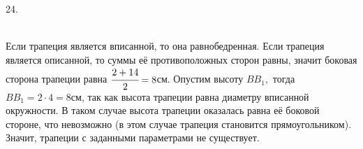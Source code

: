 24. \begin{figure}[ht!]
\end{figure}\\
Если трапеция является вписанной, то она равнобедренная. Если трапеция является описанной, то суммы её противоположных сторон равны, значит боковая сторона трапеции равна $\cfrac{2+14}{2}=8$см. Опустим высоту $BB_1,$ тогда $BB_1=2\cdot4=8$см, так как высота трапеции равна диаметру вписанной окружности. В таком случае высота трапеции оказалась равна её боковой стороне, что невозможно (в этом случае трапеция становится прямоугольником). Значит, трапеции с заданными параметрами не существует.\\
